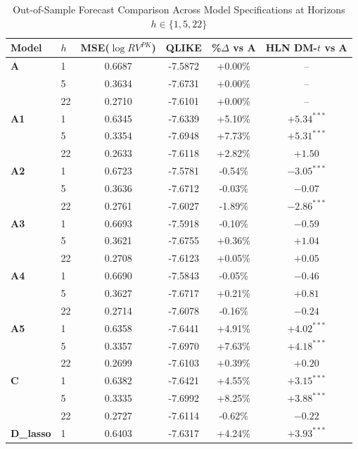 
\begin{table}[htbp]
\centering
\caption{Out-of-Sample Forecast Comparison Across Model Specifications at Horizons $h\in\{1,5,22\}$}
\label{tab:model_comparison}
\small
\begin{tabular}{llcccc}
\toprule
Model & $h$ & MSE($\log RV^{PK}$) & QLIKE & \%$\Delta$ vs A & HLN DM-$t$ vs A \\
\midrule
\textbf{A} &  1 & 0.6687 & -7.5872 & +0.00\% & -- \\
 &  5 & 0.3634 & -7.6731 & +0.00\% & -- \\
 & 22 & 0.2710 & -7.6101 & +0.00\% & -- \\
\midrule
\textbf{A1} &  1 & 0.6345 & -7.6339 & +5.10\% & $+5.34^{***}$ \\
 &  5 & 0.3354 & -7.6948 & +7.73\% & $+5.31^{***}$ \\
 & 22 & 0.2633 & -7.6118 & +2.82\% & $+1.50$ \\
\midrule
\textbf{A2} &  1 & 0.6723 & -7.5781 & -0.54\% & $-3.05^{***}$ \\
 &  5 & 0.3636 & -7.6712 & -0.03\% & $-0.07$ \\
 & 22 & 0.2761 & -7.6027 & -1.89\% & $-2.86^{***}$ \\
\midrule
\textbf{A3} &  1 & 0.6693 & -7.5918 & -0.10\% & $-0.59$ \\
 &  5 & 0.3621 & -7.6755 & +0.36\% & $+1.04$ \\
 & 22 & 0.2708 & -7.6123 & +0.05\% & $+0.05$ \\
\midrule
\textbf{A4} &  1 & 0.6690 & -7.5843 & -0.05\% & $-0.46$ \\
 &  5 & 0.3627 & -7.6717 & +0.21\% & $+0.81$ \\
 & 22 & 0.2714 & -7.6078 & -0.16\% & $-0.24$ \\
\midrule
\textbf{A5} &  1 & 0.6358 & -7.6441 & +4.91\% & $+4.02^{***}$ \\
 &  5 & 0.3357 & -7.6970 & +7.63\% & $+4.18^{***}$ \\
 & 22 & 0.2699 & -7.6103 & +0.39\% & $+0.20$ \\
\midrule
\textbf{C} &  1 & 0.6382 & -7.6421 & +4.55\% & $+3.15^{***}$ \\
 &  5 & 0.3335 & -7.6992 & +8.25\% & $+3.88^{***}$ \\
 & 22 & 0.2727 & -7.6114 & -0.62\% & $-0.22$ \\
\midrule
\textbf{D\_lasso} &  1 & 0.6403 & -7.6317 & +4.24\% & $+3.93^{***}$ \\

\end{tabular}
\end{table}
